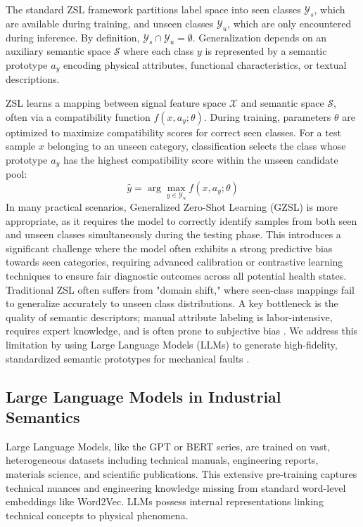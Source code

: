 \documentclass[journal]{IEEEtran}
\begin{document}
The standard ZSL framework partitions label space into seen classes $\mathcal{Y}_s$, which are available during training, and unseen classes $\mathcal{Y}_u$, which are only encountered during inference. By definition, $\mathcal{Y}_s \cap \mathcal{Y}_u = \emptyset$. Generalization depends on an auxiliary semantic space $\mathcal{S}$ where each class $y$ is represented by a semantic prototype $a_y$ encoding physical attributes, functional characteristics, or textual descriptions.

ZSL learns a mapping between signal feature space $\mathcal{X}$ and semantic space $\mathcal{S}$, often via a compatibility function $f(x, a_y; \theta)$. During training, parameters $\theta$ are optimized to maximize compatibility scores for correct seen classes. For a test sample $x$ belonging to an unseen category, classification selects the class whose prototype $a_y$ has the highest compatibility score within the unseen candidate pool:
\begin{equation}
\hat{y} = \arg\max_{y \in \mathcal{Y}_u} f(x, a_y; \theta)
\end{equation}
In many practical scenarios, Generalized Zero-Shot Learning (GZSL) is more appropriate, as it requires the model to correctly identify samples from both seen and unseen classes simultaneously during the testing phase. This introduces a significant challenge where the model often exhibits a strong predictive bias towards seen categories, requiring advanced calibration or contrastive learning techniques to ensure fair diagnostic outcomes across all potential health states. Traditional ZSL often suffers from "domain shift," where seen-class mappings fail to generalize accurately to unseen class distributions. A key bottleneck is the quality of semantic descriptors; manual attribute labeling is labor-intensive, requires expert knowledge, and is often prone to subjective bias \cite{palatucci2009zero, lampert2009learning}. We address this limitation by using Large Language Models (LLMs) to generate high-fidelity, standardized semantic prototypes for mechanical faults \cite{xian2018zero}.

\subsection{Large Language Models in Industrial Semantics}
Large Language Models, like the GPT or BERT series, are trained on vast, heterogeneous datasets including technical manuals, engineering reports, materials science, and scientific publications. This extensive pre-training captures technical nuances and engineering knowledge missing from standard word-level embeddings like Word2Vec. LLMs possess internal representations linking technical concepts to physical phenomena.
\end{document}
